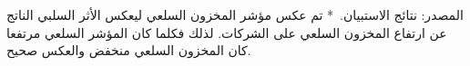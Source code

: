 المصدر: نتائج الاستبيان.\
* تم عكس مؤشر المخزون السلعي ليعكس الأثر السلبي الناتج عن ارتفاع المخزون السلعي على الشركات. لذلك فكلما كان المؤشر السلعي مرتفعا كان المخزون السلعي منخفض والعكس صحيح.
